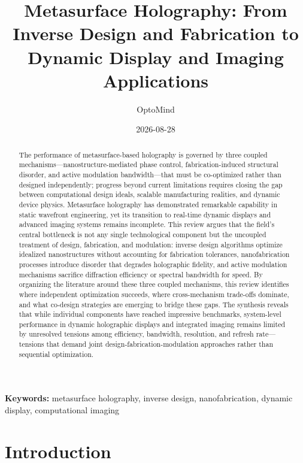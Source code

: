 \documentclass[11pt]{article}
\title{Metasurface Holography: From Inverse Design and Fabrication to Dynamic Display and Imaging Applications}
\author{OptoMind}
\date{2026-08-28}
\begin{document}
\maketitle

\begin{abstract}
The performance of metasurface-based holography is governed by three coupled mechanisms---nanostructure-mediated phase control, fabrication-induced structural disorder, and active modulation bandwidth---that must be co-optimized rather than designed independently; progress beyond current limitations requires closing the gap between computational design ideals, scalable manufacturing realities, and dynamic device physics. Metasurface holography has demonstrated remarkable capability in static wavefront engineering, yet its transition to real-time dynamic displays and advanced imaging systems remains incomplete. This review argues that the field's central bottleneck is not any single technological component but the uncoupled treatment of design, fabrication, and modulation: inverse design algorithms optimize idealized nanostructures without accounting for fabrication tolerances, nanofabrication processes introduce disorder that degrades holographic fidelity, and active modulation mechanisms sacrifice diffraction efficiency or spectral bandwidth for speed. By organizing the literature around these three coupled mechanisms, this review identifies where independent optimization succeeds, where cross-mechanism trade-offs dominate, and what co-design strategies are emerging to bridge these gaps. The synthesis reveals that while individual components have reached impressive benchmarks, system-level performance in dynamic holographic displays and integrated imaging remains limited by unresolved tensions among efficiency, bandwidth, resolution, and refresh rate---tensions that demand joint design-fabrication-modulation approaches rather than sequential optimization.
\end{abstract}

\noindent\textbf{Keywords:} metasurface holography, inverse design, nanofabrication, dynamic display, computational imaging

\section{Introduction}\label{introduction}
\end{document}
